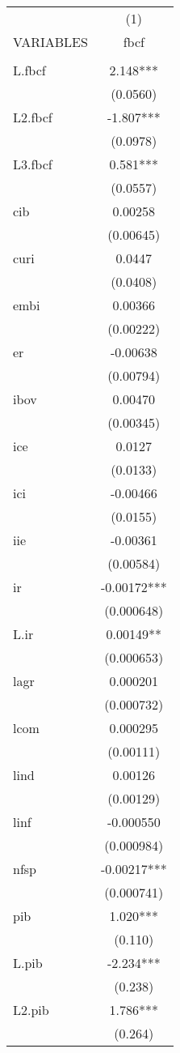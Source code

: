 \begin{tabular}{lc} \hline
 & (1) \\
VARIABLES & fbcf \\ \hline
 &  \\
L.fbcf & 2.148*** \\
 & (0.0560) \\
L2.fbcf & -1.807*** \\
 & (0.0978) \\
L3.fbcf & 0.581*** \\
 & (0.0557) \\
cib & 0.00258 \\
 & (0.00645) \\
curi & 0.0447 \\
 & (0.0408) \\
embi & 0.00366 \\
 & (0.00222) \\
er & -0.00638 \\
 & (0.00794) \\
ibov & 0.00470 \\
 & (0.00345) \\
ice & 0.0127 \\
 & (0.0133) \\
ici & -0.00466 \\
 & (0.0155) \\
iie & -0.00361 \\
 & (0.00584) \\
ir & -0.00172*** \\
 & (0.000648) \\
L.ir & 0.00149** \\
 & (0.000653) \\
lagr & 0.000201 \\
 & (0.000732) \\
lcom & 0.000295 \\
 & (0.00111) \\
lind & 0.00126 \\
 & (0.00129) \\
linf & -0.000550 \\
 & (0.000984) \\
nfsp & -0.00217*** \\
 & (0.000741) \\
pib & 1.020*** \\
 & (0.110) \\
L.pib & -2.234*** \\
 & (0.238) \\
L2.pib & 1.786*** \\
 & (0.264) \\

\end{tabular}
